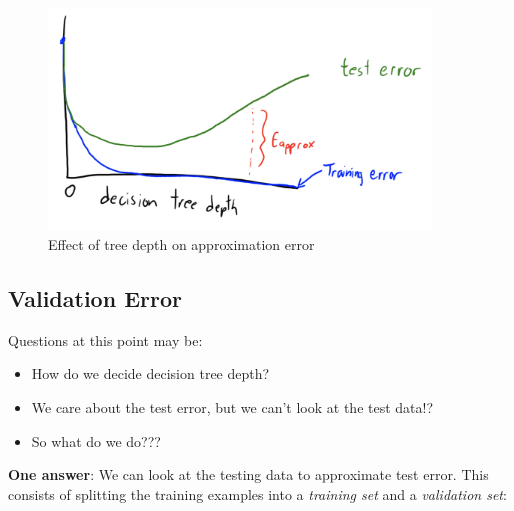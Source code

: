 \documentclass{article}
\theoremstyle{definition}
\begin{document}
\begin{figure}[H]
	\centering
	\includegraphics[width = 4in]{Pic9}
	\caption{Effect of tree depth on approximation error}
\end{figure}

\subsection*{Validation Error}
Questions at this point may be:
	\begin{itemize}
		\item How do we decide decision tree depth?
		\item We care about the test error, but we can't look at the test data!?
		\item So what do we do???
	\end{itemize}
\textbf{One answer}: We can look at the testing data to approximate test error. This consists of splitting the training examples into a \textsl{training set} and a \textsl{validation set}:
\end{document}
